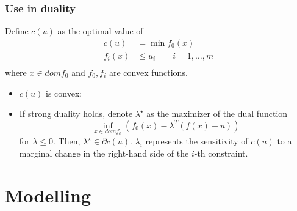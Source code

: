 \documentclass[12pt, openany]{report}
\theoremstyle{definition}
\begin{document}
\subsection{Use in duality}
Define $c(u)$ as the optimal value of 
\begin{equation}
	\begin{aligned}
		c(u)&=\min f_0(x)\\
		f_i(x) &\le u_i \qquad i=1,\dots,m\\
	\end{aligned}
\end{equation}
where $x\in dom f_0$ and $f_0,f_i$ are convex functions.
\begin{itemize}
	\item $c(u)$ is convex;
	\item If strong duality holds, denote $\lambda^\star$ as the maximizer of the dual function 
	\begin{equation}
		\inf_{x\in dom f_0} (f_0(x) - \lambda^T(f(x)-u))
	\end{equation}
	for $\lambda \le 0$. Then, $\lambda^\star \in \partial c(u)$. $\lambda_i$ represents the sensitivity of $c(u)$ to a marginal change in the right-hand side of the $i$-th constraint. 
\end{itemize}
\chapter{Modelling}
\end{document}
